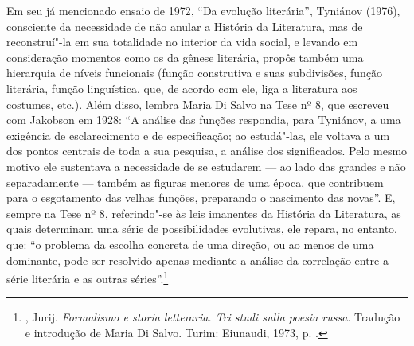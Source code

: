 Em seu já mencionado ensaio de 1972, ``Da evolução literária'', Tyniánov (1976),
consciente da necessidade de não anular a História da
Literatura, mas de reconstruí"-la em sua totalidade no interior da vida
social, e levando em consideração momentos como os da gênese literária,
propôs também uma hierarquia de níveis funcionais (função construtiva e
suas subdivisões, função literária, função linguística, que, de acordo
com ele, liga a literatura aos costumes, etc.). Além disso, lembra Maria Di
Salvo na Tese nº 8, que escreveu com Jakobson em 1928: ``A análise das funções respondia, para Tyniánov, a
uma exigência de esclarecimento e de especificação; ao estudá"-las, ele
voltava a um dos pontos centrais de toda a sua pesquisa, a análise dos
significados. Pelo mesmo motivo ele sustentava a necessidade de se
estudarem --- ao lado das grandes e não separadamente --- também as figuras
menores de uma época, que contribuem para o esgotamento das velhas
funções, preparando o nascimento das novas''. E, sempre na Tese nº 8,
referindo"-se às leis imanentes da História da Literatura, as quais determinam
uma série de possibilidades evolutivas, ele repara, no entanto, que: ``o
problema da escolha concreta de uma direção, ou ao menos de uma
dominante, pode ser resolvido apenas mediante a análise da correlação
entre a série literária e as outras séries''.\footnote{, Jurij. \emph{Formalismo e
 storia letteraria. Tri studi sulla poesia russa}. Tradução e introdução de Maria Di Salvo. Turim: Eiunaudi, 1973, p. .}

